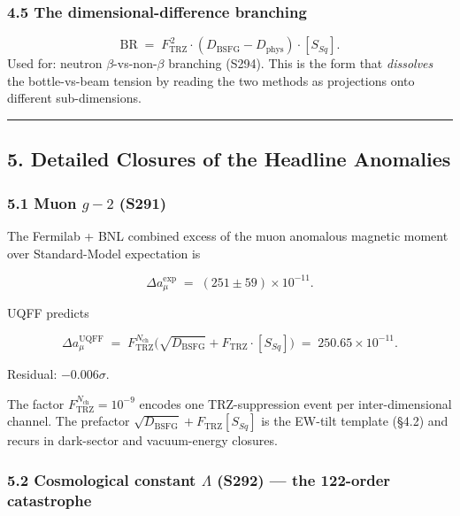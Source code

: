 \documentclass[
]{article}
\begin{document}
\subsubsection{4.5 The dimensional-difference
branching}\label{the-dimensional-difference-branching}

\[
\text{BR} \;=\; F_{\text{TRZ}}^{\,2}\cdot (D_{\text{BSFG}}-D_{\text{phys}})\cdot[S_{Sq}].
\] Used for: neutron \(\beta\)-vs-non-\(\beta\) branching (S294). This
is the form that \emph{dissolves} the bottle-vs-beam tension by reading
the two methods as projections onto different sub-dimensions.

\begin{center}\rule{0.5\linewidth}{0.5pt}\end{center}

\subsection{5. Detailed Closures of the Headline
Anomalies}\label{detailed-closures-of-the-headline-anomalies}

\subsubsection{\texorpdfstring{5.1 Muon \(g-2\)
(S291)}{5.1 Muon g-2 (S291)}}\label{muon-g-2-s291}

The Fermilab + BNL combined excess of the muon anomalous magnetic moment
over Standard-Model expectation is

\[
\Delta a_\mu^{\text{exp}} \;=\; (251 \pm 59) \times 10^{-11}.
\]

UQFF predicts

\[
\Delta a_\mu^{\text{UQFF}} \;=\; F_{\text{TRZ}}^{N_{\text{ch}}}\bigl(\sqrt{D_{\text{BSFG}}}+F_{\text{TRZ}}\cdot[S_{Sq}]\bigr) \;=\; 250.65\times 10^{-11}.
\]

Residual: \(-0.006\sigma\).

The factor \(F_{\text{TRZ}}^{N_{\text{ch}}}=10^{-9}\) encodes one
TRZ-suppression event per inter-dimensional channel. The prefactor
\(\sqrt{D_{\text{BSFG}}}+F_{\text{TRZ}}[S_{Sq}]\) is the EW-tilt
template (§4.2) and recurs in dark-sector and vacuum-energy closures.

\subsubsection{\texorpdfstring{5.2 Cosmological constant \(\Lambda\)
(S292) --- the 122-order
catastrophe}{5.2 Cosmological constant \textbackslash Lambda (S292) --- the 122-order catastrophe}}\label{cosmological-constant-lambda-s292-the-122-order-catastrophe}
\end{document}
